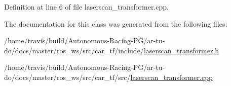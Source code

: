 Definition at line 6 of file laserscan\+\_\+transformer.\+cpp.



The documentation for this class was generated from the following files\+:\begin{DoxyCompactItemize}
\item 
/home/travis/build/\+Autonomous-\/\+Racing-\/\+P\+G/ar-\/tu-\/do/docs/master/ros\+\_\+ws/src/car\+\_\+tf/include/\hyperlink{laserscan__transformer_8h}{laserscan\+\_\+transformer.\+h}\item 
/home/travis/build/\+Autonomous-\/\+Racing-\/\+P\+G/ar-\/tu-\/do/docs/master/ros\+\_\+ws/src/car\+\_\+tf/src/\hyperlink{laserscan__transformer_8cpp}{laserscan\+\_\+transformer.\+cpp}\end{DoxyCompactItemize}
